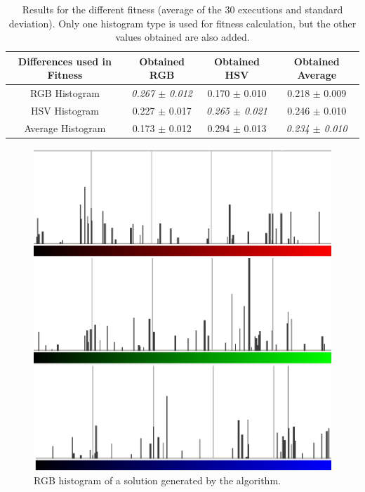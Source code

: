 \documentclass[a4paper,twoside]{article}
\begin{document}
\begin{table}
\centering
\caption{Results for the different fitness (average of the 30 executions and standard deviation). Only one histogram type is used for fitness calculation, but the other values obtained are also added.}
\begin{tabular}{|c|c|c|c|} \hline
Differences used  in Fitness & Obtained RGB      & Obtained HSV  & Obtained Average \\ \hline
RGB Histogram    & {\em 0.267 $\pm$ 0.012}	& 0.170 $\pm$ 0.010 	& 0.218 $\pm$ 0.009	\\ \hline
HSV Histogram    & 0.227 $\pm$ 0.017	& {\em 0.265 $\pm$ 0.021}	& 0.246 $\pm$ 0.010 \\ \hline
Average Histogram& 0.173 $\pm$ 0.012	& 0.294 $\pm$ 0.013	& {\em 0.234 $\pm$ 0.010} \\ \hline
\end{tabular}
\label{tab:results}
\end{table}

\begin{figure}
\centering
   \includegraphics[scale =0.6] {images/individuohist.eps}
\caption{RGB histogram of a solution generated by the algorithm.}
\label{fig:histoind}
\end{figure}
\end{document}
